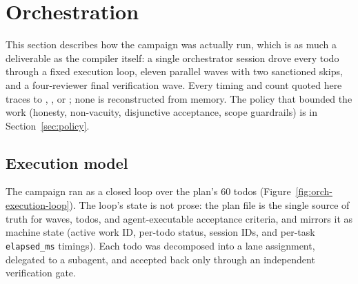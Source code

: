 \section{Orchestration}\label{sec:orchestration}

This section describes how the campaign was actually run, which is as much a
deliverable as the compiler itself: a single orchestrator session drove every
todo through a fixed execution loop, eleven parallel waves with two sanctioned
skips, and a four-reviewer final verification wave. Every timing and count
quoted here traces to , , or ; none is reconstructed from memory.
The policy that bounded the work (honesty, non-vacuity, disjunctive acceptance,
scope guardrails) is in Section~\ref{sec:policy}.

\subsection{Execution model}

The campaign ran as a closed loop over the plan's 60 todos
(Figure~\ref{fig:orch-execution-loop}). The loop's state is not prose: the plan
file  is the single source of truth for waves,
todos, and agent-executable acceptance criteria, and 
mirrors it as machine state (active work ID, per-todo status, session IDs, and
per-task \texttt{elapsed\_ms} timings). Each todo was decomposed into a lane
assignment, delegated to a subagent, and accepted back only through an
independent verification gate.


